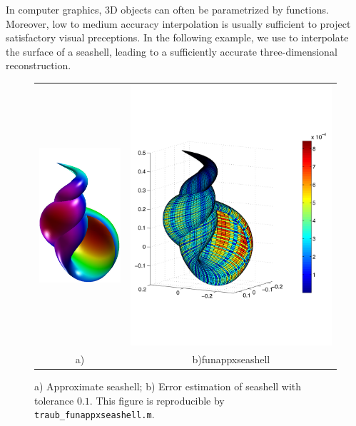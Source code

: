 
In computer graphics, 3D objects can often be parametrized by functions.
Moreover, low to medium accuracy interpolation is usually sufficient to project
satisfactory visual preceptions. In the following example, we use \funappxg to
interpolate the surface of a seashell, leading to a sufficiently accurate
three-dimensional reconstruction.

\begin{figure}[tbh]
  \centering
  \begin{tabular}{cc}
     \includegraphics[width=35mm]{figure/funappxseashell.pdf} 
  & \includegraphics[width=83mm]{figure/seashellsurferror.pdf}
  \\ a) & b)funappxseashell
  \end{tabular}
\caption{a) Approximate seashell; b) Error estimation of seashell with tolerance
$0.1$. This figure is reproducible by \texttt{traub\_funappxseashell.m}.}
\label{fig:funappxseashell}
\end{figure}
